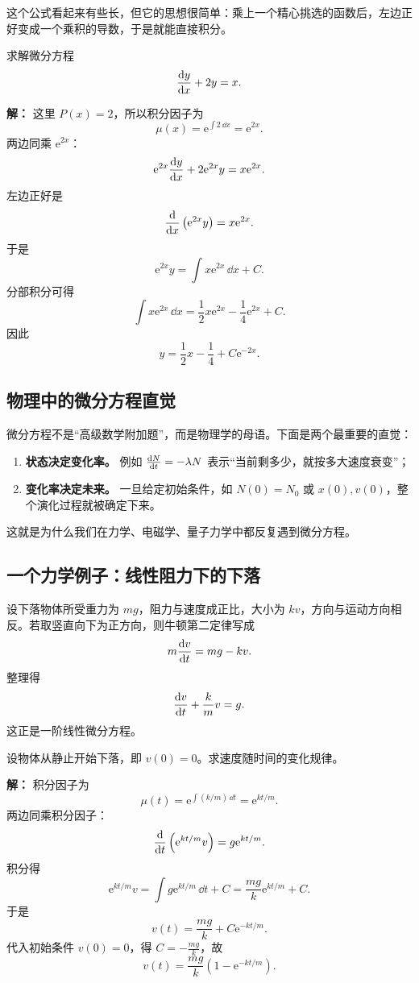 这个公式看起来有些长，但它的思想很简单：乘上一个精心挑选的函数后，左边正好变成一个乘积的导数，于是就能直接积分。

\begin{example}
求解微分方程
\[
  \dv{y}{x} + 2y = x.
\]

\textbf{解：} 这里 $P(x)=2$，所以积分因子为
\[
  \mu(x)=\mathrm{e}^{\int 2\,\dd x}=\mathrm{e}^{2x}.
\]
两边同乘 $\mathrm{e}^{2x}$：
\[
  \mathrm{e}^{2x}\dv{y}{x} + 2\mathrm{e}^{2x}y = x\mathrm{e}^{2x}.
\]
左边正好是
\[
  \dv{}{x}\left(\mathrm{e}^{2x}y\right)=x\mathrm{e}^{2x}.
\]
于是
\[
  \mathrm{e}^{2x}y = \int x\mathrm{e}^{2x}\,\dd x + C.
\]
分部积分可得
\[
  \int x\mathrm{e}^{2x}\,\dd x = \frac12 x\mathrm{e}^{2x} - \frac14 \mathrm{e}^{2x} + C.
\]
因此
\[
  y = \frac12 x - \frac14 + C\mathrm{e}^{-2x}.
\]
\end{example}

\subsection{物理中的微分方程直觉}

微分方程不是“高级数学附加题”，而是物理学的母语。下面是两个最重要的直觉：
\begin{enumerate}
  \item \textbf{状态决定变化率。} 例如 $\dv{N}{t}=-\lambda N$ 表示“当前剩多少，就按多大速度衰变”；
  \item \textbf{变化率决定未来。} 一旦给定初始条件，如 $N(0)=N_0$ 或 $x(0),v(0)$，整个演化过程就被确定下来。
\end{enumerate}
这就是为什么我们在力学、电磁学、量子力学中都反复遇到微分方程。

\subsection{一个力学例子：线性阻力下的下落}

设下落物体所受重力为 $mg$，阻力与速度成正比，大小为 $kv$，方向与运动方向相反。若取竖直向下为正方向，则牛顿第二定律写成
\[
  m\dv{v}{t}=mg-kv.
\]
整理得
\[
  \dv{v}{t}+\frac{k}{m}v=g.
\]
这正是一阶线性微分方程。

\begin{example}
设物体从静止开始下落，即 $v(0)=0$。求速度随时间的变化规律。

\textbf{解：} 积分因子为
\[
  \mu(t)=\mathrm{e}^{\int (k/m)\,\dd t}=\mathrm{e}^{kt/m}.
\]
两边同乘积分因子：
\[
  \dv{}{t}\left(\mathrm{e}^{kt/m}v\right)=g\mathrm{e}^{kt/m}.
\]
积分得
\[
  \mathrm{e}^{kt/m}v = \int g\mathrm{e}^{kt/m}\,\dd t + C = \frac{mg}{k}\mathrm{e}^{kt/m}+C.
\]
于是
\[
  v(t)=\frac{mg}{k} + C\mathrm{e}^{-kt/m}.
\]
代入初始条件 $v(0)=0$，得 $C=-\frac{mg}{k}$，故
\[
  v(t)=\frac{mg}{k}\left(1-\mathrm{e}^{-kt/m}\right).
\]
\end{example}

